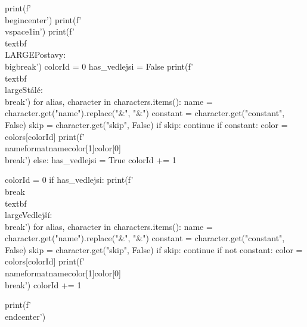 \begin{pycode}
print(f'\\begin{{center}}')
print(f'\\vspace{{1in}}')
print(f'\\textbf{{\\LARGE{{Postavy:}}}} \\bigbreak')
colorId = 0
has_vedlejsi = False
print(f'\\textbf{{\\large{{Stálé:}}}} \\break')
for alias, character in characters.items():
    name = character.get("name").replace("&", "\&")
    constant = character.get("constant", False)
    skip = character.get("skip", False)
    if skip:
        continue
    if constant:
        color = colors[colorId]
        print(f'\\nameformat{{{name}}}{{{color[1]}}}{{{color[0]}}} \\break')
    else:
        has_vedlejsi = True
    colorId += 1


colorId = 0
if has_vedlejsi:
    print(f'\\break \\textbf{{\\large{{Vedlejší:}}}} \\break')
for alias, character in characters.items():
    name = character.get("name").replace("&", "\&")
    constant = character.get("constant", False)
    skip = character.get("skip", False)
    if skip:
        continue
    if not constant:
        color = colors[colorId]
        print(f'\\nameformat{{{name}}}{{{color[1]}}}{{{color[0]}}} \\break')
    colorId += 1

print(f'\\end{{center}}')
\end{pycode}